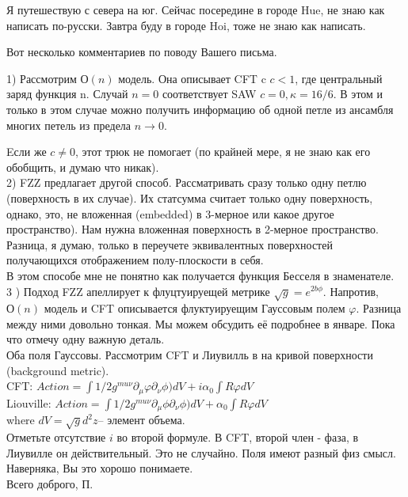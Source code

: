 \documentclass[12pt]{article}
\begin{document}
Я путешествую с севера на юг. Сейчас посередине в городе Hue, не знаю как написать по-русски. Завтра
буду в городе Hoi, тоже не знаю как написать.

Вот несколько комментариев по поводу Вашего письма.

1) Рассмотрим $О(n)$ модель. Она описывает CFT c $c<1$, где центральный заряд функция n. Случай $n=0$
соответствует SAW $c=0, \kappa=16/6$.
В этом и только в этом случае можно получить информацию об одной петле из ансамбля многих петель из
предела $n\to 0$.

Eсли же $c\neq 0$, этот трюк не помогает (по крайней мере, я не знаю как его обобщить, и думаю что
никак).
\\
2) FZZ предлагает другой способ. Рассматривать сразу только одну петлю (поверхность в их случае). Их
статсумма считает только одну поверхность, однако,
это, не вложенная (embedded) в 3-мерное или какое другое пространство). Нам нужна вложенная
поверхность в 2-мерное пространство. Разница, я думаю, только в переучете
эквивалентных поверхностей получающихся отображением полу-плоскости в себя.
\\
В этом способе мне не понятно как получается функция Бесселя в знаменателе. 
\\
3 ) Подход FZZ апеллирует к флуцтуируещей метрике $\sqrt g= e^{2b\phi}$. Напротив, $О(n)$ модель и CFT
описывается флуктуируещим Гауссовым полем $\varphi$. 
Разница между ними довольно тонкая. Мы можем обсудить её подробнее в январе. Пока что отмечу одну
важную деталь.
\\
Оба поля Гауссовы. Рассмотрим CFT и Лиувилль в на кривой поверхности (background metric). 
\\
CFT: $Action= \int 1/2 g^{mu\nu}\partial_\mu \varphi\partial_\nu\phi) dV+ i\alpha_0 \int R\varphi
dV$\\

Liouville: $Action= \int 1/2 g^{mu\nu}\partial_\mu \phi\partial_\nu\phi) dV+ \alpha_0 \int R\varphi
dV$\\

where $dV=\sqrt g d^2z$-- элемент объема.\\

Отметьте отсутствие $i$ во второй формуле. В CFT, второй член - фаза, в Лиувилле он действительный. 
Это не случайно. Поля имеют разный физ смысл.\\

Наверняка, Вы это хорошо понимаете.\\

Всего доброго,
П.
\end{document}
